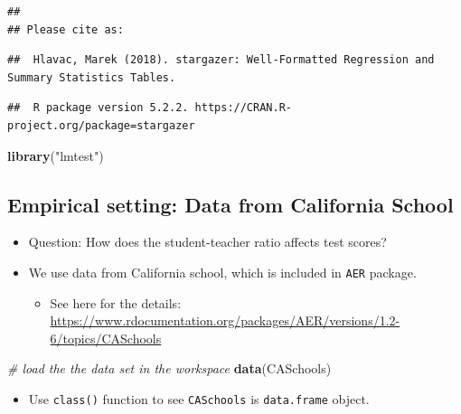 \documentclass[]{book}
\newenvironment{Shaded}{\begin{snugshade}}{\end{snugshade}}
\newcommand{\KeywordTok}[1]{\textcolor[rgb]{0.13,0.29,0.53}{\textbf{#1}}}
\newcommand{\StringTok}[1]{\textcolor[rgb]{0.31,0.60,0.02}{#1}}
\newcommand{\CommentTok}[1]{\textcolor[rgb]{0.56,0.35,0.01}{\textit{#1}}}
\newcommand{\NormalTok}[1]{#1}
\providecommand{\tightlist}{%
  \setlength{\itemsep}{0pt}\setlength{\parskip}{0pt}}
\begin{document}
\begin{verbatim}
## 
## Please cite as:
\end{verbatim}

\begin{verbatim}
##  Hlavac, Marek (2018). stargazer: Well-Formatted Regression and Summary Statistics Tables.
\end{verbatim}

\begin{verbatim}
##  R package version 5.2.2. https://CRAN.R-project.org/package=stargazer
\end{verbatim}

\begin{Shaded}
\begin{Highlighting}[]
\KeywordTok{library}\NormalTok{(}\StringTok{"lmtest"}\NormalTok{)}
\end{Highlighting}
\end{Shaded}

\subsection{Empirical setting: Data from California
School}\label{empirical-setting-data-from-california-school}

\begin{itemize}
\tightlist
\item
  Question: How does the student-teacher ratio affects test scores?
\item
  We use data from California school, which is included in \texttt{AER}
  package.

  \begin{itemize}
  \tightlist
  \item
    See here for the details:
    \url{https://www.rdocumentation.org/packages/AER/versions/1.2-6/topics/CASchools}
  \end{itemize}
\end{itemize}

\begin{Shaded}
\begin{Highlighting}[]
\CommentTok{# load the the data set in the workspace}
\KeywordTok{data}\NormalTok{(CASchools)}
\end{Highlighting}
\end{Shaded}

\begin{itemize}
\tightlist
\item
  Use \texttt{class()} function to see \texttt{CASchools} is
  \texttt{data.frame} object.
\end{itemize}
\end{document}
